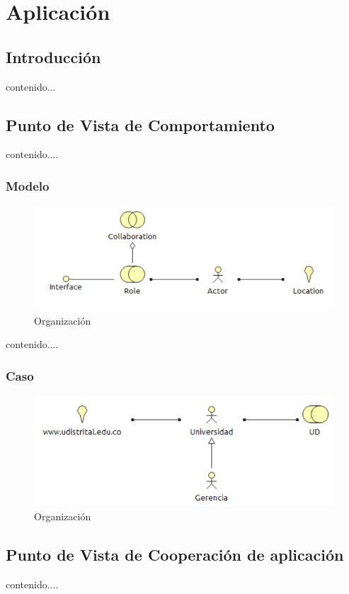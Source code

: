 \chapter{Aplicación}
\section{Introducción}
contenido...
\newpage
\section{Punto de Vista de Comportamiento}
contenido....
\subsection{Modelo}
\begin{figure}[th!]
	\centering
	\includegraphics[width=0.8\linewidth]{arquitectura_diseno/imgs/M_Organizacion}
	\caption{Organización}
\end{figure}
\newpage
contenido....
\subsection{Caso}
\begin{figure}[th!]
	\centering
	\includegraphics[width=0.8\linewidth]{arquitectura_diseno/imgs/C_Organizacion}
	\caption{Organización}
\end{figure}
\newpage
\section{Punto de Vista de Cooperación de aplicación}
contenido....
